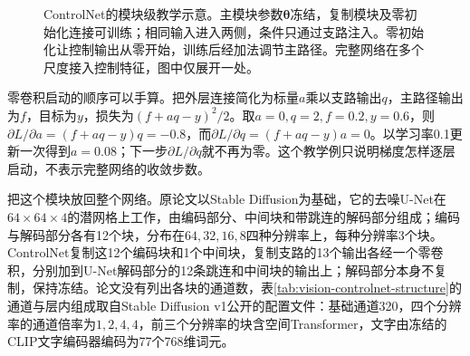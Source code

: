 \begin{figure}[htbp]
 \centering
 
 \caption{ControlNet的模块级教学示意。主模块参数$\bm{\theta}$冻结，复制模块及零初始化连接可训练；相同输入进入两侧，条件只通过支路注入。零初始化让控制输出从零开始，训练后经加法调节主路径。完整网络在多个尺度接入控制特征，图中仅展开一处。}
 \label{fig:vision-controlnet}
\end{figure}

零卷积启动的顺序可以手算。把外层连接简化为标量$a$乘以支路输出$q$，主路径输出为$f$，目标为$y$，损失为$(f+aq-y)^2/2$。取$a=0,q=2,f=0.2,y=0.6$，则$\partial L/\partial a=(f+aq-y)q=-0.8$，而$\partial L/\partial q=(f+aq-y)a=0$。以学习率0.1更新一次得到$a=0.08$；下一步$\partial L/\partial q$就不再为零。这个教学例只说明梯度怎样逐层启动，不表示完整网络的收敛步数。

把这个模块放回整个网络。原论文以Stable Diffusion为基础，它的去噪U-Net在$64\times64\times4$的潜网格上工作，由编码部分、中间块和带跳连的解码部分组成；编码与解码部分各有12个块，分布在$64,32,16,8$四种分辨率上，每种分辨率3个块。ControlNet复制这12个编码块和1个中间块，复制支路的13个输出各经一个零卷积，分别加到U-Net解码部分的12条跳连和中间块的输出上；解码部分本身不复制，保持冻结。论文没有列出各块的通道数，表\ref{tab:vision-controlnet-structure}的通道与层内组成取自Stable Diffusion v1公开的配置文件：基础通道320，四个分辨率的通道倍率为$1,2,4,4$，前三个分辨率的块含空间Transformer，文字由冻结的CLIP文字编码器编码为77个768维词元。


